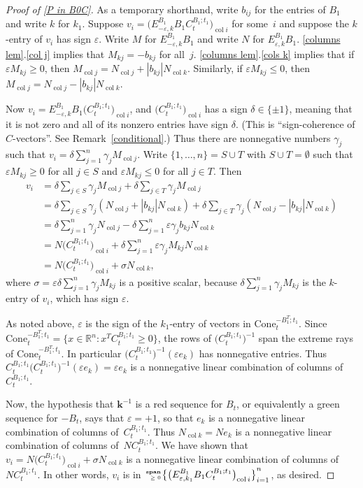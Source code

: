\documentclass{amsart}
\theoremstyle{definition}
\theoremstyle{remark}
\numberwithin{equation}{section}
\newcommand{\reals}{\mathbb R}
\newcommand{\ep}{\varepsilon}
\newcommand{\col}{\operatorname{col}}
\newcommand{\nnspan}{{\!\!\tiny\begin{array}{r}\mathbf{span}\\\ge0\end{array}\hspace*{-0.57em}}}
\newcommand{\set}[1]{{\lbrace #1 \rbrace}}
\newcommand{\sett}[1]{{\bigl\lbrace #1 \bigr\rbrace}}
\newcommand{\0}{{\mathbf{0}}}
\newcommand{\Cone}{\mathrm{Cone}}
\newcommand{\kk}{\mathbf{k}}
\begin{document}
\begin{proof}[Proof of \cref{P in B0C}]
As a temporary shorthand, write $b_{ij}$ for the entries of $B_1$ and write $k$ for $k_1$.
Suppose $v_i=\bigl(E^{B_1}_{-\ep,k}B_1C_t^{B_1;t_1}\bigr)_{\col i}$ for some~$i$ and suppose the $k$-entry of $v_i$ has sign $\ep$.
Write $M$ for $E^{B_1}_{-\ep,k}B_1$ and write $N$ for $E^{B_1}_{\ep,k}B_1$.
\cref{columns lem}.\ref{col j} implies that $M_{kj}=-b_{kj}$ for all~$j$.
\cref{columns lem}.\ref{cols k} implies that if $\ep M_{kj}\ge0$, then $M_{\col j}=N_{\col j}+|b_{kj}|N_{\col k}$.
Similarly, if $\ep M_{kj}\le0$, then $M_{\col j}=N_{\col j}-|b_{kj}|N_{\col k}$.

Now $v_i=E^{B_1}_{-\ep,k}B_1\bigl(C_t^{B_1;t_1}\bigr)_{\col i}$, and $\bigl(C_t^{B_1;t_1}\bigr)_{\col i}$ has a sign $\delta\in\set{\pm1}$, meaning that it is not zero and all of its nonzero entries have sign $\delta$.
(This is ``sign-coherence of $C$-vectors''.  
See Remark~\ref{conditional}.)
Thus there are nonnegative numbers $\gamma_j$ such that $v_i=\delta\sum_{j=1}^n\gamma_jM_{\col j}$.
Write $\set{1,\ldots,n}=S\cup T$ with $S\cup T=\emptyset$ such that $\ep M_{kj}\ge0$ for all $j\in S$ and $\ep M_{kj}\le0$ for all $j\in T$.
Then
\begin{align*}
v_i
&=\delta\sum_{j\in S}\gamma_jM_{\col j}+\delta\sum_{j\in T}\gamma_jM_{\col j}\\
&=\delta\sum_{j\in S}\gamma_j(N_{\col j}+|b_{kj}|N_{\col k})+\delta\sum_{j\in T}\gamma_j(N_{\col j}-|b_{kj}|N_{\col k})\\
&=\delta\sum_{j=1}^n\gamma_jN_{\col j}-\delta\sum_{j=1}^n\ep\gamma_jb_{kj}N_{\col k}\\
&=N\bigl(C_t^{B_1;t_1}\bigr)_{\col i}+\delta\sum_{j=1}^n\ep\gamma_jM_{kj}N_{\col k}\\
&=N\bigl(C_t^{B_1;t_1}\bigr)_{\col i}+\sigma N_{\col k},
\end{align*}
where $\sigma=\ep\delta\sum_{j=1}^n\gamma_jM_{kj}$ is a positive scalar, because $\delta\sum_{j=1}^n\gamma_jM_{kj}$ is the $k$-entry of $v_i$, which has sign $\ep$.

As noted above, $\ep$ is the sign of the $k_1$-entry of vectors in $\Cone_t^{-B_1^T;t_1}$.
Since $\Cone^{-B_1^T;t_1}_t=\set{x\in\reals^n:x^TC_t^{B_1;t_1}\ge0}$, the rows of $\bigl(C_t^{B_1;t_1}\bigr)^{-1}$ span the extreme rays of $\Cone_t^{-B_1^T;t_1}$.
In particular $\bigl(C_t^{B_1;t_1}\bigr)^{-1}(\ep e_k)$ has nonnegative entries.
Thus $C_t^{B_1;t_1}\bigl(C_t^{B_1;t_1}\bigr)^{-1}(\ep e_k)=\ep e_k$ is a nonnegative linear combination of columns of~$C_t^{B_1;t_1}$.

Now, the hypothesis that $\kk^{-1}$ is a red sequence for $B_t$, or equivalently a green sequence for $-B_t$, says that $\ep=+1$, so that $e_k$ is a nonnegative linear combination of columns of~$C_t^{B_1;t_1}$.
Thus $N_{\col k}=Ne_k$ is a nonnegative linear combination of columns of~$NC_t^{B_1;t_1}$.
We have shown that $v_i=N\bigl(C_t^{B_1;t_1}\bigr)_{\col i}+\sigma N_{\col k}$ is a nonnegative linear combination of columns of~$NC_t^{B_1;t_1}$.
In other words, $v_i$ is in $\nnspan\sett{\bigl(E^{B_1}_{\ep,k_1}B_1C_t^{B_1;t_1}\bigr)_{\col i}}_{i=1}^n$, as desired.
\end{proof}
\end{document}
